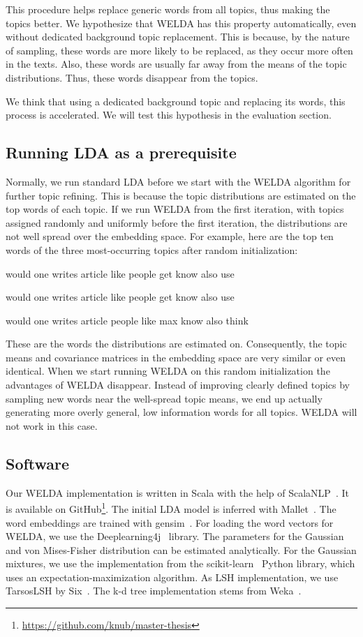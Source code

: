 \documentclass[
        a4paper,
        titlepage,
        twoside,
        parskip,
        numbers=noenddot
        ]{scrbook}
\newcommand{\topicbox}[1]{
  \setlength{\OuterFrameSep}{0pt}
  \begin{framed}
    #1
  \end{framed}
}
\theoremstyle{break}
\begin{document}
This procedure helps replace generic words from all topics, thus making the topics better.
We hypothesize that WELDA has this property automatically, even without dedicated background topic replacement.
This is because, by the nature of sampling, these words are more likely to be replaced, as they occur more often in the texts.
Also, these words are usually far away from the means of the topic distributions.
Thus, these words disappear from the topics.

We think that using a dedicated background topic and replacing its words, this process is accelerated.
We will test this hypothesis in the evaluation section.

\subsection{Running LDA as a prerequisite}
Normally, we run standard LDA before we start with the WELDA algorithm for further topic refining.
This is because the topic distributions are estimated on the top words of each topic.
If we run WELDA from the first iteration, with topics assigned randomly and uniformly before the first iteration, the distributions are not well spread over the embedding space.
For example, here are the top ten words of the three most-occurring topics after random initialization:
\topicbox{
  would one writes article like people get know also use \par
  would one writes article like people get know also use \par
  would one writes article people like max know also think
}

These are the words the distributions are estimated on.
Consequently, the topic means and covariance matrices in the embedding space are very similar or even identical.
When we start running WELDA on this random initialization the advantages of WELDA disappear.
Instead of improving clearly defined topics by sampling new words near the well-spread topic means, we end up actually generating more overly general, low information words for all topics.
WELDA will not work in this case.

\subsection{Software}

Our WELDA implementation is written in Scala with the help of ScalaNLP~\cite{ScalaNlp2009}.
It is available on GitHub\footnote{\url{https://github.com/knub/master-thesis}}.
The initial LDA model is inferred  with Mallet~\cite{McCallum2002}.
The word embeddings are trained with gensim~\cite{Rehurek2010}.
For loading the word vectors for WELDA, we use the Deeplearning4j~\cite{DL4J2016} library.
The parameters for the Gaussian and von Mises-Fisher distribution can be estimated analytically.
For the Gaussian mixtures, we use the implementation from the scikit-learn~\cite{Pedregosa2012} Python library, which uses an expectation-maximization algorithm.
As LSH implementation, we use TarsosLSH by Six~\cite{Six2016}.
The k-d tree implementation stems from Weka~\cite{Hall2009}.
\end{document}
